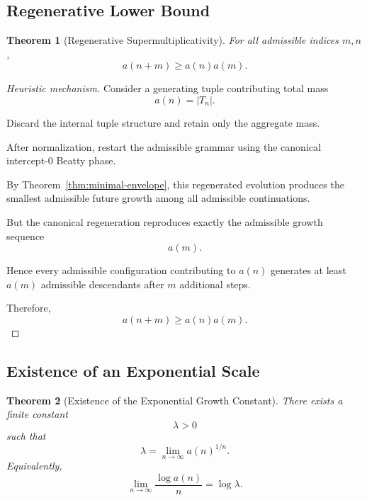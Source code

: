 \documentclass[12pt, oneside]{article}
\numberwithin{equation}{section}
\theoremstyle{definition}
\theoremstyle{plain}
\newtheorem{theorem}{Theorem}[section]
\theoremstyle{remark}
\begin{document}

\subsection{Regenerative Lower Bound}


\begin{theorem}[Regenerative Supermultiplicativity]
\label{thm:supermultiplicative}
For all admissible indices $m,n$,
\[
a(n+m)\ge a(n)a(m).
\]
\end{theorem}

\begin{proof}[Heuristic mechanism]
Consider a generating tuple contributing total mass
\[
a(n)=|T_n|.
\]

Discard the internal tuple structure and retain only the aggregate
mass.

After normalization, restart the admissible grammar using the
canonical intercept-$0$ Beatty phase.

By Theorem~\ref{thm:minimal-envelope}, this regenerated evolution
produces the smallest admissible future growth among all admissible
continuations.

But the canonical regeneration reproduces exactly the admissible
growth sequence
\[
a(m).
\]

Hence every admissible configuration contributing to $a(n)$
generates at least $a(m)$ admissible descendants after $m$
additional steps.

Therefore,
\[
a(n+m)\ge a(n)a(m).
\]
\end{proof}


\subsection{Existence of an Exponential Scale}


\begin{theorem}[Existence of the Exponential Growth Constant]
\label{thm:lambda-exists}
There exists a finite constant
\[
\lambda>0
\]
such that
\[
\lambda
=
\lim_{n\to\infty} a(n)^{1/n}.
\]
Equivalently,
\[
\lim_{n\to\infty}\frac{\log a(n)}{n}
=
\log\lambda.
\]
\end{theorem}
\end{document}
